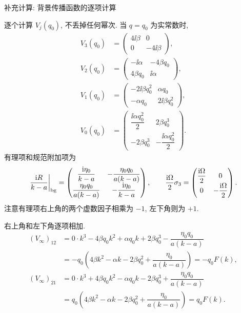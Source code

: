 \par\medskip\noindent 补充计算: 背景传播函数的逐项计算\par
\par\smallskip\noindent 逐个计算 $V_j(q_0)$, 不丢掉任何幂次.\quad
当 $q=q_0$ 为实常数时,
\begin{align*}
V_3(q_0)&=
\begin{pmatrix}4\ii\beta&0\\0&-4\ii\beta\end{pmatrix},\\
V_2(q_0)&=
\begin{pmatrix}-\ii\alpha&-4\beta q_0\\4\beta q_0&\ii\alpha\end{pmatrix},\\
V_1(q_0)&=
\begin{pmatrix}-2\ii\beta q_0^2&\alpha q_0\\-\alpha q_0&2\ii\beta q_0^2\end{pmatrix},\\
V_0(q_0)&=
\begin{pmatrix}
\dfrac{\ii\alpha q_0^2}{2}&2\beta q_0^3\\
-2\beta q_0^3&-\dfrac{\ii\alpha q_0^2}{2}
\end{pmatrix}.
\end{align*}
有理项和规范附加项为
\begin{equation*}
\left.\dfrac{\mathrm{i} R}{k-a}\right|_{\rm bg}
=\begin{pmatrix}
\dfrac{\mathrm{i}\eta_0}{k-a}&-\dfrac{\eta_0q_0}{a(k-a)}\\
\dfrac{\eta_0q_0}{a(k-a)}&-\dfrac{\mathrm{i}\eta_0}{k-a}
\end{pmatrix},
\qquad
\dfrac{\mathrm{i}\Omega}{2}\sigma_3
=\begin{pmatrix}\dfrac{\mathrm{i}\Omega}{2}&0\\0&-\dfrac{\mathrm{i}\Omega}{2}\end{pmatrix}.
\end{equation*}
注意有理项右上角的两个虚数因子相乘为 $-1$, 左下角则为 $+1$.
\par\smallskip\noindent 右上角和左下角逐项相加.\quad
\begin{align*}
(V_\infty)_{12}
&=0\cdot k^3-4\beta q_0k^2
+\alpha q_0k+2\beta q_0^3
-\dfrac{\eta_0q_0}{a(k-a)}\\
&=-q_0\left(4\beta k^2-\alpha k-2\beta q_0^2
+\dfrac{\eta_0}{a(k-a)}\right)
=-q_0F(k),\\
(V_\infty)_{21}
&=0\cdot k^3+4\beta q_0k^2
-\alpha q_0k-2\beta q_0^3
+\dfrac{\eta_0q_0}{a(k-a)}\\
&=q_0\left(4\beta k^2-\alpha k-2\beta q_0^2
+\dfrac{\eta_0}{a(k-a)}\right)
=q_0F(k).
\end{align*}
